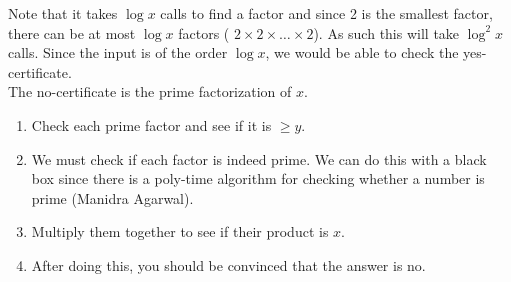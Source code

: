 \documentclass[../main/main.tex]{subfiles}
\begin{document}
Note that it takes $\log x$ calls to find a factor and since 2 is the smallest factor, there can be at most $\log x$ factors ( $2\times 2\times \ldots\times 2$). As such this will take $\log^2 x$ calls. Since the input is of the order $\log x$, we would be able to check the yes-certificate.\\

The no-certificate is the prime factorization of $x$.
 \begin{enumerate}
	\item Check each prime factor and see if it is $\ge y$.
	\item We must check if each factor is indeed prime. We can do this with a black box since there is a poly-time algorithm for checking whether a number is prime (Manidra Agarwal).
	\item Multiply them together to see if their product is $x$.
	\item After doing this, you should be convinced that the answer is no.
\end{enumerate}
\end{document}
